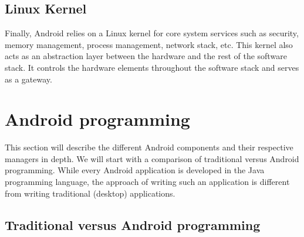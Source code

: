 \subsection{Linux Kernel}

Finally, Android relies on a Linux kernel for core system services such as security, memory management, process management, network stack, etc. This kernel also acts as an abstraction layer between the hardware and the rest of the software stack. It controls the hardware elements throughout the software stack and serves as a gateway.

\section{Android programming}

This section will describe the different Android components and their respective managers in depth. We will start with a comparison of traditional versus Android programming. While every Android application is developed in the Java programming language, the approach of writing such an application is different from writing traditional (desktop) applications.

\subsection{Traditional versus Android programming}

